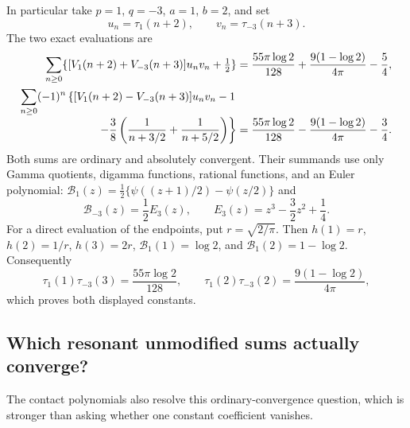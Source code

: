 In particular take $p=1$, $q=-3$, $a=1$, $b=2$, and set
\[
 u_n=\tau_1(n+2),\qquad v_n=\tau_{-3}(n+3).
\]
The two exact evaluations are
\begin{align}
 \sum_{n\ge0}\{[V_1(n+2)+V_{-3}(n+3)]u_nv_n+\tfrac12\}
 &=\frac{55\pi\log2}{128}
      +\frac{9(1-\log2)}{4\pi}-\frac54,\label{ct:exampleplus}\\
 \sum_{n\ge0}(-1)^n\left\{
 [V_1(n+2)-V_{-3}(n+3)]u_nv_n-1\right.&\notag\\[-3pt]
 \left.\hspace{6mm}-\frac38\left(\frac1{n+3/2}+\frac1{n+5/2}\right)
 \right\}
 &=\frac{55\pi\log2}{128}
      -\frac{9(1-\log2)}{4\pi}-\frac34.\label{ct:exampleminus}
\end{align}
Both sums are ordinary and absolutely convergent. Their summands use only
Gamma quotients, digamma functions, rational functions, and an Euler
polynomial: $\mathcal B_1(z)=\tfrac12\{\psi((z+1)/2)-\psi(z/2)\}$ and
\[
 \mathcal B_{-3}(z)=\frac12E_3(z),\qquad
 E_3(z)=z^3-\frac32z^2+\frac14.
\]
For a direct evaluation of the endpoints, put $r=\sqrt{2/\pi}$. Then
$h(1)=r$, $h(2)=1/r$, $h(3)=2r$,
$\mathcal B_1(1)=\log2$, and $\mathcal B_1(2)=1-\log2$. Consequently
\[
 \tau_1(1)\tau_{-3}(3)=\frac{55\pi\log2}{128},\qquad
 \tau_1(2)\tau_{-3}(2)=\frac{9(1-\log2)}{4\pi},
\]
which proves both displayed constants.

\subsection{Which resonant unmodified sums actually converge?}

The contact polynomials also resolve this ordinary-convergence question,
which is stronger than asking whether one constant coefficient vanishes.

